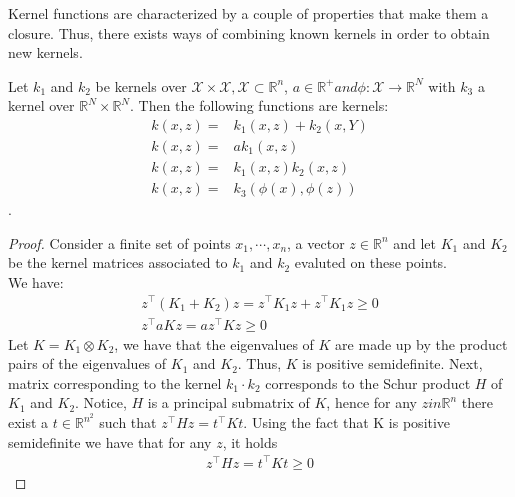 Kernel functions are characterized by a couple of properties that make them a closure. Thus, there exists ways of combining known kernels in order to obtain new kernels.

\begin{proposition}
    Let $k_1$ and $k_2$ be kernels over $\mathcal{X} \times \mathcal{X}, \mathcal{X} \subset \mathbb{R}^n$, $a \in \mathbb{R}^+ and \phi: \mathcal{X} \to \mathbb{R}^N$ with $k_3$ a kernel over $\mathbb{R}^N \times \mathbb{R}^N$. Then the following functions are kernels:
    \begin{align}
        k(x,z)=&k_1(x,z)+k_2(x,Y)
        \\
        k(x,z)=& ak_1(x,z)
        \\
        k(x,z)=& k_1(x,z)k_2(x,z)
        \\
        k(x,z)=& k_3(\phi(x),\phi(z))
    \end{align}.
\end{proposition}

\begin{proof}
    Consider a finite set of points $x_1, \cdots, x_n$, a vector $z \in \mathbb{R}^n$ and let $K_1$ and $K_2$ be the kernel matrices associated to $k_1$ and $k_2$ evaluted on these points.
    \\
    We have:
    \\
    \begin{align}
    z^\intercal (K_1+K_2) z= z^\intercal K_1 z + z^\intercal K_1 z \geq 0
    \\
    z^\intercal aK z= a z^\intercal K z \geq 0
    \end{align}
    Let $K=K_1 \otimes K_2$, we have that the eigenvalues of $K$ are made up by the product pairs of the eigenvalues of $K_1$ and $K_2$. Thus, $K$ is positive semidefinite. Next, matrix corresponding to the kernel $k_1 \cdot k_2$ corresponds to the Schur product $H$ of $K_1$ and $K_2$. Notice, $H$ is a principal submatrix of $K$, hence for any $z in \mathbb{R}^n$ there exist a $t \in \mathbb{R}^{n^2}$ such that $z^\intercal H z= t^\intercal K t$. Using the fact that K is positive semidefinite we have that for any $z$, it holds 
    \begin{align}
        z^\intercal H z= t^\intercal K t\geq 0
    \end{align}
\end{proof}

